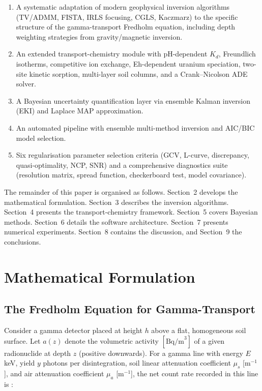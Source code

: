 \documentclass[a4paper,11pt]{article}
\begin{document}
\begin{enumerate}[label=(\roman*)]
  \item A systematic adaptation of modern geophysical inversion algorithms
        (TV/ADMM, FISTA, IRLS focusing, CGLS, Kaczmarz) to the specific
        structure of the gamma-transport Fredholm equation, including
        depth weighting strategies from gravity/magnetic inversion.
  \item An extended transport-chemistry module with pH-dependent $K_d$,
        Freundlich isotherms, competitive ion exchange, Eh-dependent
        uranium speciation, two-site kinetic sorption, multi-layer soil
columns, and a Crank--Nicolson ADE solver.
  \item A Bayesian uncertainty quantification layer via ensemble Kalman
        inversion (EKI) and Laplace MAP approximation.
  \item An automated pipeline with ensemble multi-method inversion and
        AIC/BIC model selection.
  \item Six regularisation parameter selection criteria (GCV, L-curve,
        discrepancy, quasi-optimality, NCP, SNR) and a comprehensive
        diagnostics suite (resolution matrix, spread function,
        checkerboard test, model covariance).
\end{enumerate}

The remainder of this paper is organised as follows.  Section~2
develops the mathematical formulation.  Section~3 describes the inversion
algorithms.  Section~4 presents the transport-chemistry framework.
Section~5 covers Bayesian methods.  Section~6 details the software
architecture.  Section~7 presents numerical experiments.  Section~8
contains the discussion, and Section~9 the conclusions.


\section{Mathematical Formulation}\label{sec:math}

\subsection{The Fredholm Equation for Gamma-Transport}

Consider a gamma detector placed at height $h$ above a flat, homogeneous
soil surface.  Let $a(z)$ denote the volumetric activity
$[\text{Bq/m}^3]$ of a given radionuclide at depth $z$ (positive
downwards).  For a gamma line with energy $E$ keV, yield $y$ photons per
disintegration, soil linear attenuation coefficient $\mu_s$ [m$^{-1}$],
and air attenuation coefficient $\mu_a$ [m$^{-1}$], the net count rate
recorded in this line is \citep{beck1968deconvolution}:
\end{document}
